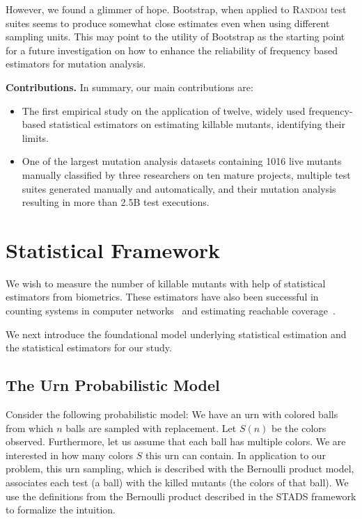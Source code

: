 \documentclass[sigconf]{acmart}
\newcommand{\estimatorCount}{twelve\xspace}
\newcommand{\projectCount}{ten\xspace}
\newcommand{\Bootstrap}{Bootstrap\xspace}
\newcommand{\EvosuiteRandom}{\textsc{Random}\xspace}
\begin{document}
\ifdefined\BOOTSTRAP
However, we found a glimmer of hope. \Bootstrap, when applied to \EvosuiteRandom
test suites seems to produce somewhat close estimates even when using different
sampling units. This may point to the utility of \Bootstrap as the starting
point for a future investigation on how to enhance the reliability of frequency
based estimators for mutation analysis.
\fi

\textbf{Contributions.}
In summary, our main contributions are:
\begin{itemize}
   \item The first empirical study on the application of \estimatorCount,
         widely used frequency-based statistical %
         estimators
         on estimating killable mutants,
         identifying their limits.
   \item One of the largest %
mutation analysis datasets containing 1016 live mutants manually
classified by three researchers on \projectCount mature projects,
multiple test suites generated manually and automatically,
and their mutation analysis resulting in more than 2.5B test executions.
\end{itemize}

\section{Statistical Framework}
\label{sec:mapping}
We wish to measure the number of killable mutants with help of statistical estimators from biometrics.
These estimators
have also been successful in counting systems in
computer networks~\cite{accettura2015the} and
estimating reachable coverage~\cite{bohme2018stads}.

We next introduce 
the foundational model underlying statistical estimation and the statistical
estimators for our study.

\subsection{The Urn Probabilistic Model}
Consider the following probabilistic model:
We have an urn with colored balls from which $n$ balls are
sampled with replacement. Let $S(n)$ be the colors observed.
Furthermore, let us assume that each ball has multiple colors.
We are interested in how many colors $S$ this urn can contain.
In application to our problem, this urn sampling, which is described with the Bernoulli product model, associates each test (a ball) with the killed mutants (the colors of that ball). %
We use the definitions from the Bernoulli product described in the STADS framework
to formalize the intuition.
\end{document}
